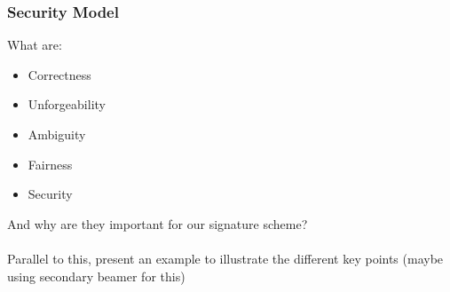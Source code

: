 \begin{frame}
	\frametitle{Security Model}

	What are:
	\begin{itemize}
		\item Correctness
		\item Unforgeability
		\item Ambiguity
		\item Fairness
		\item Security
	\end{itemize}
	And why are they important for our signature scheme?\\
	~\\
	Parallel to this, present an example to illustrate the different key points (maybe using secondary beamer for this)
\end{frame}
